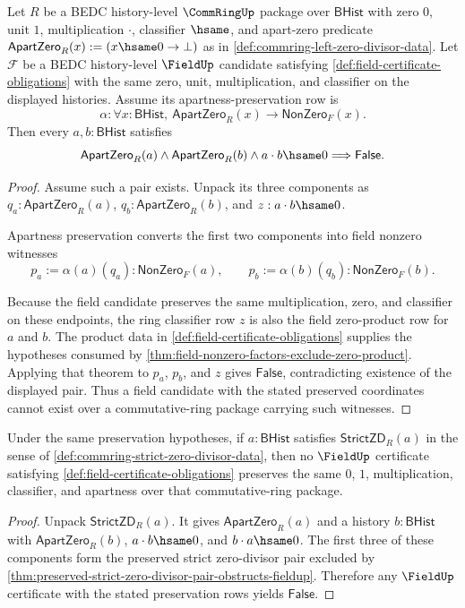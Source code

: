 \begin{theorem}
\label{thm:preserved-strict-zero-divisor-pair-obstructs-fieldup}
Let $R$ be a BEDC history-level $\CommRingUp$ package over $\mathsf{BHist}$
with zero $0$, unit $1$, multiplication $\cdot$, classifier $\hsame$, and
apart-zero predicate $\mathsf{ApartZero}_R(x):=(x\hsame0\to\bot)$ as in
\autoref{def:commring-left-zero-divisor-data}. Let $\mathcal F$ be a
BEDC history-level $\FieldUp$ candidate satisfying
\autoref{def:field-certificate-obligations} with the same zero, unit,
multiplication, and classifier on the displayed histories. Assume its
apartness-preservation row is
$$
\alpha:\forall x:\mathsf{BHist},\ \mathsf{ApartZero}_R(x)\to\mathsf{NonZero}_F(x).
$$
Then every $a,b:\mathsf{BHist}$ satisfies
$$
\mathsf{ApartZero}_R(a)\land
\mathsf{ApartZero}_R(b)\land
a\cdot b\hsame0
\Longrightarrow
\mathsf{False}.
$$
\end{theorem}
\begin{proof}
Assume such a pair exists. Unpack its three components as
$q_a:\mathsf{ApartZero}_R(a)$, $q_b:\mathsf{ApartZero}_R(b)$, and
$z:a\cdot b\hsame0$.

Apartness preservation converts the first two components into field nonzero
witnesses
$$
p_a:=\alpha(a)(q_a):\mathsf{NonZero}_F(a),
\qquad
p_b:=\alpha(b)(q_b):\mathsf{NonZero}_F(b).
$$

Because the field candidate preserves the same multiplication, zero, and
classifier on these endpoints, the ring classifier row $z$ is also the field
zero-product row for $a$ and $b$. The product data in
\autoref{def:field-certificate-obligations} supplies the hypotheses consumed by
\autoref{thm:field-nonzero-factors-exclude-zero-product}. Applying that theorem
to $p_a$, $p_b$, and $z$ gives $\mathsf{False}$, contradicting existence of the
displayed pair. Thus a field candidate with the stated preserved coordinates
cannot exist over a commutative-ring package carrying such witnesses.
\end{proof}

\begin{corollary}
\label{cor:strict-zero-divisor-obstructs-fieldup}
Under the same preservation hypotheses, if $a:\mathsf{BHist}$ satisfies
$\mathsf{StrictZD}_R(a)$ in the sense of
\autoref{def:commring-strict-zero-divisor-data}, then no $\FieldUp$ certificate
satisfying \autoref{def:field-certificate-obligations} preserves the same $0$,
$1$, multiplication, classifier, and apartness over that commutative-ring
package.
\end{corollary}
\begin{proof}
Unpack $\mathsf{StrictZD}_R(a)$. It gives $\mathsf{ApartZero}_R(a)$ and a
history $b:\mathsf{BHist}$ with $\mathsf{ApartZero}_R(b)$,
$a\cdot b\hsame0$, and $b\cdot a\hsame0$. The first three of these components
form the preserved strict zero-divisor pair excluded by
\autoref{thm:preserved-strict-zero-divisor-pair-obstructs-fieldup}. Therefore
any $\FieldUp$ certificate with the stated preservation rows yields
$\mathsf{False}$.
\end{proof}
